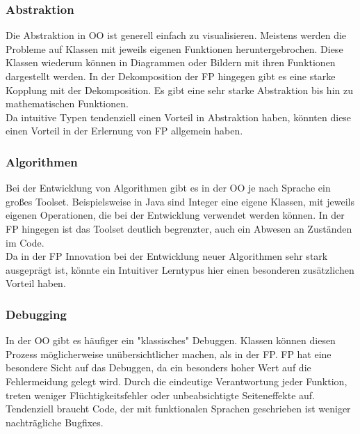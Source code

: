 \subsubsection{Abstraktion}
Die Abstraktion in OO ist generell einfach zu visualisieren. Meistens werden die Probleme auf Klassen mit jeweils eigenen Funktionen heruntergebrochen. Diese Klassen wiederum können in Diagrammen oder Bildern mit ihren Funktionen dargestellt werden.
In der Dekomposition der FP hingegen gibt es eine starke Kopplung mit der Dekomposition. Es gibt eine sehr starke Abstraktion bis hin zu mathematischen Funktionen.
\\
Da intuitive Typen tendenziell einen Vorteil in Abstraktion haben, könnten diese einen Vorteil in der Erlernung von FP allgemein haben.

\subsubsection{Algorithmen}
Bei der Entwicklung von Algorithmen gibt es in der OO je nach Sprache ein großes Toolset. Beispielsweise in Java sind Integer eine eigene Klassen, mit jeweils eigenen Operationen, die bei der Entwicklung verwendet werden können. In der FP hingegen ist das Toolset deutlich begrenzter, auch ein Abwesen an Zuständen im Code.
\\
Da in der FP Innovation bei der Entwicklung neuer Algorithmen sehr stark ausgeprägt ist, könnte ein Intuitiver Lerntypus hier einen besonderen zusätzlichen Vorteil haben.

\subsubsection{Debugging}
In der OO gibt es häufiger ein "klassisches" Debuggen. Klassen können diesen Prozess möglicherweise unübersichtlicher machen, als in der FP. FP hat eine besondere Sicht auf das Debuggen, da ein besonders hoher Wert auf die Fehlermeidung gelegt wird. Durch die eindeutige Verantwortung jeder Funktion, treten weniger Flüchtigkeitsfehler oder unbeabsichtigte Seiteneffekte auf. Tendenziell braucht Code, der mit funktionalen Sprachen geschrieben ist weniger nachträgliche Bugfixes.

